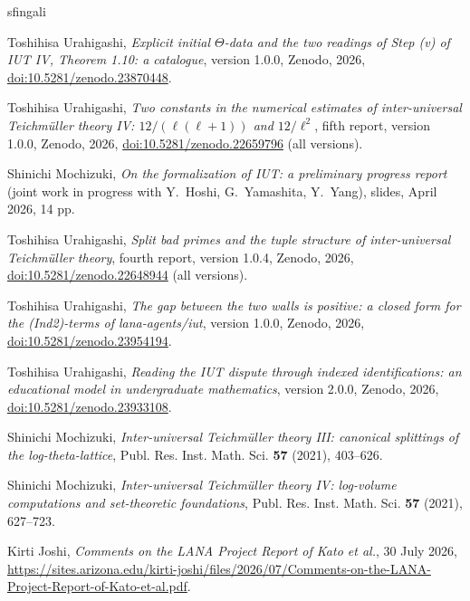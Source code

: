 \documentclass[11pt,a4paper]{article}
\theoremstyle{plain}
\theoremstyle{definition}
\theoremstyle{remark}
\begin{document}
\begin{thebibliography}{sfingali}\raggedright
{}
Toshihisa Urahigashi, \emph{Explicit initial $\Theta$-data and the two readings of Step (v) of IUT IV, Theorem 1.10:
a catalogue}, version 1.0.0, Zenodo, 2026, \href{https://doi.org/10.5281/zenodo.23870448}{doi:10.5281/zenodo.23870448}.

Toshihisa Urahigashi, \emph{Two constants in the numerical estimates of inter-universal {T}eichm\"uller theory {IV}:
$12/(\ell(\ell+1))$ and $12/\ell^2$}, fifth report, version 1.0.0, Zenodo, 2026,
\href{https://doi.org/10.5281/zenodo.22659796}{doi:10.5281/zenodo.22659796} (all versions).

Shinichi Mochizuki, \emph{On the formalization of IUT: a preliminary progress report} (joint work in progress with
Y.~Hoshi, G.~Yamashita, Y.~Yang), slides, April 2026, 14 pp.

Toshihisa Urahigashi, \emph{Split bad primes and the tuple structure of inter-universal {T}eichm\"uller theory}, fourth
report, version 1.0.4, Zenodo, 2026, \href{https://doi.org/10.5281/zenodo.22648944}{doi:10.5281/zenodo.22648944} (all
versions).

Toshihisa Urahigashi, \emph{The gap between the two walls is positive: a closed form for the (Ind2)-terms of
lana-agents/iut}, version 1.0.0, Zenodo, 2026, \href{https://doi.org/10.5281/zenodo.23954194}{doi:10.5281/zenodo.23954194}.

Toshihisa Urahigashi, \emph{Reading the IUT dispute through indexed identifications: an educational model in
undergraduate mathematics}, version 2.0.0, Zenodo, 2026,
\href{https://doi.org/10.5281/zenodo.23933108}{doi:10.5281/zenodo.23933108}.

Shinichi Mochizuki, \emph{Inter-universal {T}eichm\"uller theory {III}: canonical splittings of the log-theta-lattice},
Publ. Res. Inst. Math. Sci. \textbf{57} (2021), 403--626.

Shinichi Mochizuki, \emph{Inter-universal {T}eichm\"uller theory {IV}: log-volume computations and set-theoretic
foundations}, Publ. Res. Inst. Math. Sci. \textbf{57} (2021), 627--723.

Kirti Joshi, \emph{Comments on the LANA Project Report of Kato et al.}, 30 July 2026,
\url{https://sites.arizona.edu/kirti-joshi/files/2026/07/Comments-on-the-LANA-Project-Report-of-Kato-et-al.pdf}.


\end{thebibliography}
\end{document}
